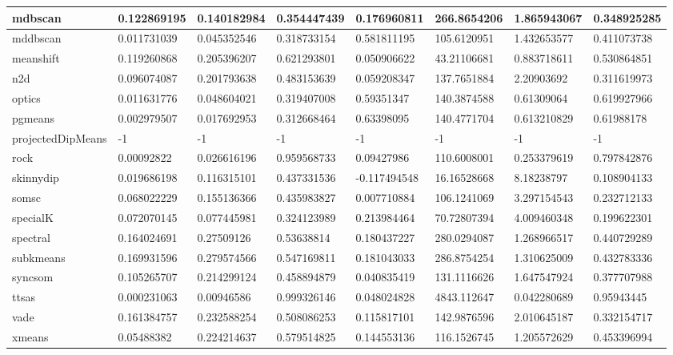 \begin{table}[H]
\begin{tabular}{|l|l|l|l|l|l|l|l|}
\hline
mdbscan & 0.122869195 & 0.140182984 & 0.354447439 & 0.176960811 & 266.8654206 & 1.865943067 & 0.348925285 \\
\hline
mddbscan & 0.011731039 & 0.045352546 & 0.318733154 & 0.581811195 & 105.6120951 & 1.432653577 & 0.411073738 \\
\hline
meanshift & 0.119260868 & 0.205396207 & 0.621293801 & 0.050906622 & 43.21106681 & 0.883718611 & 0.530864851 \\
\hline
n2d & 0.096074087 & 0.201793638 & 0.483153639 & 0.059208347 & 137.7651884 & 2.20903692 & 0.311619973 \\
\hline
optics & 0.011631776 & 0.048604021 & 0.319407008 & 0.59351347 & 140.3874588 & 0.61309064 & 0.619927966 \\
\hline
pgmeans & 0.002979507 & 0.017692953 & 0.312668464 & 0.63398095 & 140.4771704 & 0.613210829 & 0.61988178 \\
\hline
projectedDipMeans & -1 & -1 & -1 & -1 & -1 & -1 & -1 \\
\hline
rock & 0.00092822 & 0.026616196 & 0.959568733 & 0.09427986 & 110.6008001 & 0.253379619 & 0.797842876 \\
\hline
skinnydip & 0.019686198 & 0.116315101 & 0.437331536 & -0.117494548 & 16.16528668 & 8.18238797 & 0.108904133 \\
\hline
somsc & 0.068022229 & 0.155136366 & 0.435983827 & 0.007710884 & 106.1241069 & 3.297154543 & 0.232712133 \\
\hline
specialK & 0.072070145 & 0.077445981 & 0.324123989 & 0.213984464 & 70.72807394 & 4.009460348 & 0.199622301 \\
\hline
spectral & 0.164024691 & 0.27509126 & 0.53638814 & 0.180437227 & 280.0294087 & 1.268966517 & 0.440729289 \\
\hline
subkmeans & 0.169931596 & 0.279574566 & 0.547169811 & 0.181043033 & 286.8754254 & 1.310625009 & 0.432783336 \\
\hline
syncsom & 0.105265707 & 0.214299124 & 0.458894879 & 0.040835419 & 131.1116626 & 1.647547924 & 0.377707988 \\
\hline
ttsas & 0.000231063 & 0.00946586 & 0.999326146 & 0.048024828 & 4843.112647 & 0.042280689 & 0.95943445 \\
\hline
vade & 0.161384757 & 0.232588254 & 0.508086253 & 0.115817101 & 142.9876596 & 2.010645187 & 0.332154717 \\
\hline
xmeans & 0.05488382 & 0.224214637 & 0.579514825 & 0.144553136 & 116.1526745 & 1.205572629 & 0.453396994 \\
\hline
\end{tabular}
\end{table}